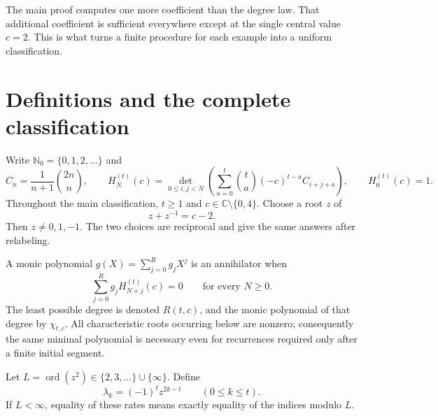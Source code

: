 \documentclass[11pt,a4paper]{article}
\numberwithin{equation}{section}
\theoremstyle{definition}
\theoremstyle{remark}
\newcommand{\NN}{\mathbb N_0}
\newcommand{\CC}{\mathbb C}
\newcommand{\ord}{\operatorname{ord}}
\newcommand{\cH}[2]{H_{#1}^{(#2)}}
\begin{document}
The main proof computes one more coefficient than the degree law.
That additional coefficient is sufficient everywhere except at the
single central value $c=2$.  This is what turns a finite procedure for
each example into a uniform classification.

\section{Definitions and the complete classification}\label{cyc:sec:main}

Write $\NN=\{0,1,2,\ldots\}$ and
\begin{equation}\label{cyc:eq:Hdef}
 C_n=\frac1{n+1}\binom{2n}{n},\qquad
 \cH Nt(c)=\det_{0\le i,j<N}
 \left(\sum_{a=0}^{t}\binom ta(-c)^{t-a}C_{i+j+a}\right),
 \qquad \cH0t(c)=1.
\end{equation}
Throughout the main classification, $t\ge1$ and $c\in\CC\setminus\{0,4\}$.
Choose a root $z$ of
\begin{equation}\label{cyc:eq:zparam}
 z+z^{-1}=c-2.
\end{equation}
Then $z\ne0,1,-1$.  The two choices are reciprocal and give the same
answers after relabeling.

A monic polynomial $g(X)=\sum_{j=0}^{R}g_jX^j$ is an annihilator when
\begin{equation}\label{cyc:eq:annihilate}
 \sum_{j=0}^{R}g_j\cH{N+j}t(c)=0\qquad\text{for every }N\ge0.
\end{equation}
The least possible degree is denoted $R(t,c)$, and the monic polynomial
of that degree by $\chi_{t,c}$.  All characteristic roots occurring below
are nonzero; consequently the same minimal polynomial is necessary even
for recurrences required only after a finite initial segment.

Let $L=\ord(z^2)\in\{2,3,\ldots\}\cup\{\infty\}$.  Define
\begin{equation}\label{cyc:eq:lambda}
 \lambda_k=(-1)^t z^{2k-t}\qquad(0\le k\le t).
\end{equation}
If $L<\infty$, equality of these rates means exactly equality of the
indices modulo $L$.
\end{document}
